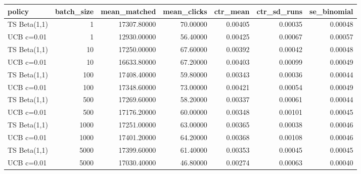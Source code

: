 \begin{tabular}{lrrrrrr}
\toprule
policy & batch\_size & mean\_matched & mean\_clicks & ctr\_mean & ctr\_sd\_runs & se\_binomial \\
\midrule
TS Beta(1,1) & 1 & 17307.80000 & 70.00000 & 0.00405 & 0.00035 & 0.00048 \\
UCB c=0.01 & 1 & 12930.00000 & 56.40000 & 0.00425 & 0.00067 & 0.00057 \\
TS Beta(1,1) & 10 & 17250.00000 & 67.60000 & 0.00392 & 0.00042 & 0.00048 \\
UCB c=0.01 & 10 & 16633.80000 & 67.20000 & 0.00403 & 0.00099 & 0.00049 \\
TS Beta(1,1) & 100 & 17408.40000 & 59.80000 & 0.00343 & 0.00036 & 0.00044 \\
UCB c=0.01 & 100 & 17348.60000 & 73.00000 & 0.00421 & 0.00054 & 0.00049 \\
TS Beta(1,1) & 500 & 17269.60000 & 58.20000 & 0.00337 & 0.00061 & 0.00044 \\
UCB c=0.01 & 500 & 17176.20000 & 60.00000 & 0.00348 & 0.00101 & 0.00045 \\
TS Beta(1,1) & 1000 & 17251.00000 & 63.00000 & 0.00365 & 0.00038 & 0.00046 \\
UCB c=0.01 & 1000 & 17401.20000 & 64.20000 & 0.00368 & 0.00108 & 0.00046 \\
TS Beta(1,1) & 5000 & 17399.60000 & 61.40000 & 0.00353 & 0.00045 & 0.00045 \\
UCB c=0.01 & 5000 & 17030.40000 & 46.80000 & 0.00274 & 0.00063 & 0.00040 \\
\bottomrule
\end{tabular}
